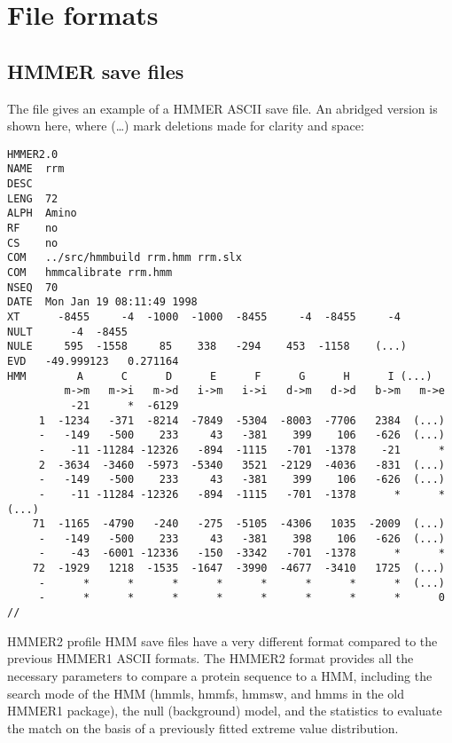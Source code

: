 \chapter{File formats}

\section{HMMER save files}

The file  gives an example of a HMMER ASCII save
file. An abridged version is shown here, where (\ldots) mark deletions
made for clarity and space:

{\small\begin{verbatim}
HMMER2.0
NAME  rrm
DESC  
LENG  72
ALPH  Amino
RF    no
CS    no
COM   ../src/hmmbuild rrm.hmm rrm.slx
COM   hmmcalibrate rrm.hmm
NSEQ  70
DATE  Mon Jan 19 08:11:49 1998
XT      -8455     -4  -1000  -1000  -8455     -4  -8455     -4 
NULT      -4  -8455
NULE     595  -1558     85    338   -294    453  -1158    (...)
EVD   -49.999123   0.271164
HMM        A      C      D      E      F      G      H      I (...)
         m->m   m->i   m->d   i->m   i->i   d->m   d->d   b->m   m->e
          -21      *  -6129
     1  -1234   -371  -8214  -7849  -5304  -8003  -7706   2384  (...)
     -   -149   -500    233     43   -381    399    106   -626  (...)
     -    -11 -11284 -12326   -894  -1115   -701  -1378    -21      * 
     2  -3634  -3460  -5973  -5340   3521  -2129  -4036   -831  (...)
     -   -149   -500    233     43   -381    399    106   -626  (...)
     -    -11 -11284 -12326   -894  -1115   -701  -1378      *      * 
(...)
    71  -1165  -4790   -240   -275  -5105  -4306   1035  -2009  (...) 
     -   -149   -500    233     43   -381    398    106   -626  (...)
     -    -43  -6001 -12336   -150  -3342   -701  -1378      *      * 
    72  -1929   1218  -1535  -1647  -3990  -4677  -3410   1725  (...)
     -      *      *      *      *      *      *      *      *  (...) 
     -      *      *      *      *      *      *      *      *      0 
//
\end{verbatim}}


HMMER2 profile HMM save files have a very different format compared to
the previous HMMER1 ASCII formats. The HMMER2 format provides all the
necessary parameters to compare a protein sequence to a HMM, including
the search mode of the HMM (hmmls, hmmfs, hmmsw, and hmms in the old
HMMER1 package), the null (background) model, and the statistics to
evaluate the match on the basis of a previously fitted extreme value
distribution.

